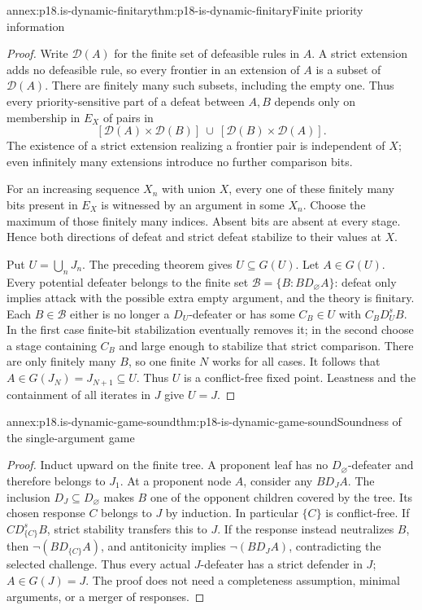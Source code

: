 \begin{annexitem}{annex:p18.is-dynamic-finitary}{thm:p18-is-dynamic-finitary}{Finite priority information}
\begin{proof}
Write \(\mathcal D(A)\) for the finite set of defeasible rules in
\(A\). A strict extension adds no defeasible rule, so every frontier
in an extension of \(A\) is a subset of \(\mathcal D(A)\).
There are finitely many such subsets, including the empty one.
Thus every priority-sensitive part of a defeat between \(A,B\)
depends only on membership in \(E_X\) of pairs in
\[
 [\mathcal D(A)\times\mathcal D(B)]
 \ \cup\ [\mathcal D(B)\times\mathcal D(A)].
\]
The existence of a strict extension realizing a frontier pair is
independent of \(X\); even infinitely many extensions introduce no
further comparison bits.

For an increasing sequence \(X_n\) with union \(X\), every one
of these finitely many bits present in \(E_X\) is witnessed by
an argument in some \(X_n\). Choose the maximum of those finitely
many indices. Absent bits are absent at every stage. Hence both
directions of defeat and strict defeat stabilize to their values
at \(X\).

Put \(U=\bigcup_nJ_n\). The preceding theorem gives \(U\subseteq G(U)\).
Let \(A\in G(U)\). Every potential defeater belongs to the finite
set
\(\mathcal B=\{B:B D_\varnothing A\}\):
defeat only implies attack with the possible extra empty argument,
and the theory is finitary. Each \(B\in\mathcal B\) either is no
longer a \(D_U\)-defeater or has some \(C_B\in U\) with
\(C_BD_U^sB\). In the first case finite-bit stabilization eventually
removes it; in the second choose a stage containing \(C_B\) and
large enough to stabilize that strict comparison. There are only
finitely many \(B\), so one finite \(N\) works for all cases.
It follows that \(A\in G(J_N)=J_{N+1}\subseteq U\).
Thus \(U\) is a conflict-free fixed point. Leastness and the
containment of all iterates in \(J\) give \(U=J\).
\end{proof}
\end{annexitem}

\begin{annexitem}{annex:p18.is-dynamic-game-sound}{thm:p18-is-dynamic-game-sound}{Soundness of the single-argument game}
\begin{proof}
Induct upward on the finite tree. A proponent leaf has no
\(D_\varnothing\)-defeater and therefore belongs to \(J_1\).
At a proponent node \(A\), consider any \(B D_JA\).
The inclusion \(D_J\subseteq D_\varnothing\) makes \(B\) one
of the opponent children covered by the tree. Its chosen response
\(C\) belongs to \(J\) by induction. In particular \(\{C\}\)
is conflict-free.
If \(C D_{\{C\}}^sB\), strict stability transfers this to \(J\).
If the response instead neutralizes \(B\), then
\(\neg(B D_{\{C\}} A)\), and antitonicity implies
\(\neg(B D_JA)\), contradicting the selected challenge.
Thus every actual \(J\)-defeater has a strict defender in \(J\);
\(A\in G(J)=J\). The proof does not need a completeness assumption,
minimal arguments, or a merger of responses.
\end{proof}
\end{annexitem}

